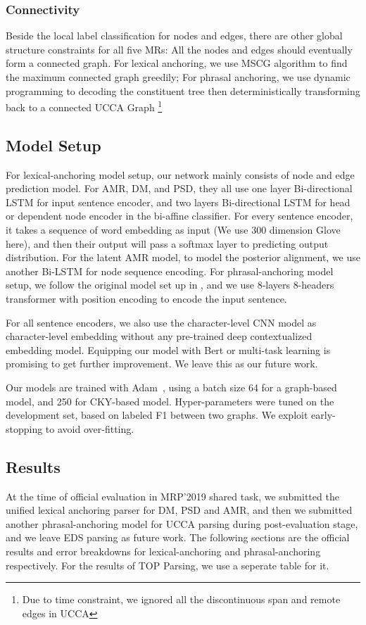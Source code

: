 \subsubsection{Connectivity}
\label{sssec:lex:connectivity}

Beside the local label classification for
nodes and edges, there are other global structure constraints for all
five MRs: All the nodes and edges should eventually form a connected
graph. For lexical anchoring, we use MSCG algorithm to find the
maximum connected graph greedily; For phrasal anchoring, we use
dynamic programming to decoding the constituent tree then
deterministically transforming back to a connected UCCA Graph
\footnote{Due to time
  constraint, we ignored all the discontinuous span and remote edges
  in UCCA}

\subsection{Model Setup}
\label{ssec:exp_setup}

For lexical-anchoring model setup, our network mainly consists of node
and edge prediction model. For AMR, DM, and PSD, they all use one
layer Bi-directional LSTM for input sentence encoder, and two layers
Bi-directional LSTM for head or dependent node encoder in the
bi-affine classifier. For every sentence encoder, it takes a sequence
of word embedding as input (We use 300 dimension Glove here), and then
their output will pass a softmax layer to predicting output
distribution. For the latent AMR model, to model the posterior
alignment, we use another Bi-LSTM for node sequence encoding. For
phrasal-anchoring model setup, we follow the original model set up in
\citet{kitaev2018constituency}, and we use 8-layers 8-headers
transformer with position encoding to encode the input sentence.

For all sentence encoders, we also use the character-level CNN model
as character-level embedding without any pre-trained deep
contextualized embedding model. Equipping our model with Bert or
multi-task learning is promising to get further improvement. We leave
this as our future work.

Our models are trained with Adam~\cite{kingma2014adam}, using a batch
size 64 for a graph-based model, and 250 for CKY-based
model. Hyper-parameters were tuned on the development set, based on
labeled F1 between two graphs. We exploit early-stopping to avoid
over-fitting.

\subsection{Results}
\label{ssec:results}
At the time of official evaluation in MRP'2019 shared task, we
submitted the unified lexical anchoring parser for DM, PSD and AMR,
and then we submitted another phrasal-anchoring model for UCCA parsing
during post-evaluation stage, and we leave EDS parsing as future
work. The following sections are the official results and error
breakdowns for lexical-anchoring and phrasal-anchoring
respectively. For the results of TOP Parsing, we use a seperate table
for it.

